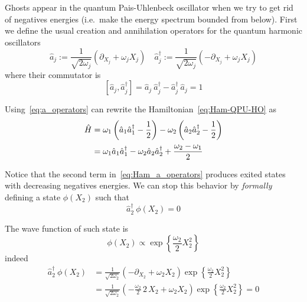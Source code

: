 Ghosts appear in the quantum Pais-Uhlenbeck oscillator when we try to get rid
of negatives energies (i.e.\ make the energy spectrum bounded from below).
First we define the usual creation and annihilation operators for the
quantum harmonic oscillators
\begin{equation} \label{eq:a_operators}
  \hat{a}_j := \frac{1}{\sqrt{2\omega_j}}
    \left(\partial_{X_j} + \omega_j X_j\right) \quad
  \hat{a}_j^{\dagger} := \frac{1}{\sqrt{2\omega_j}}
    \left(-\partial_{X_j} + \omega_j X_j\right)
\end{equation}
where their commutator is
\begin{equation} \label{eq:a_commutator}
  \left[ \hat{a}_j, \hat{a}_j^{\dagger} \right] =
  \hat{a}_j \ \hat{a}_j^{\dagger} - \hat{a}_j^{\dagger} \ \hat{a}_j = 1
\end{equation}

Using~\eqref{eq:a_operators} can rewrite the Hamiltonian~\eqref{eq:Ham-QPU-HO} as
\begin{align} \label{eq:Ham_a_operators}
  \hat{H} &=
    \omega_1 \left( \hat{a}_1 \hat{a}_1^{\dagger} - \frac{1}{2} \right) -
    \omega_2 \left( \hat{a}_2 \hat{a}_2^{\dagger} - \frac{1}{2} \right) \notag
    \\    &=
    \omega_1 \hat{a}_1 \hat{a}_1^{\dagger} -
    \omega_2 \hat{a}_2 \hat{a}_2^{\dagger} +
    \frac{\omega_2 - \omega_1}{2}
\end{align}

Notice that the second term in~\eqref{eq:Ham_a_operators} produces exited states
with decreasing negatives energies. We can stop this behavior by \emph{formally}
defining a state $\phi(X_2)$ such that
\begin{equation*}
  \hat{a}_2^{\dagger} \ \phi(X_2) = 0
\end{equation*}

The wave function of such state is~\cite{Ilhan13}
\begin{equation*}
  \phi(X_2) \propto \exp \left\{ \frac{\omega_2}{2} X_2^2\right\}
\end{equation*}
indeed
\begin{align*}
  \hat{a}_2^{\dagger} \ \phi(X_2)
  &= \frac{1}{\sqrt{2\omega_2}}
    \left(-\partial_{X_2} + \omega_2 X_2\right)
    \exp \left\{ \frac{\omega_2}{2} X_2^2\right\} \\
  &= \frac{1}{\sqrt{2\omega_2}}
    \left(-\frac{\omega_2}{2} \, 2 \, X_2 + \omega_2 X_2\right)
    \exp \left\{ \frac{\omega_2}{2} X_2^2\right\}
  = 0
\end{align*}

